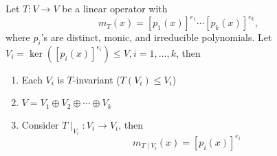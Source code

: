 \begin{theorem}
Let $T:V\to V$ be a linear operator with
\[
m_T(x) = [p_1(x)]^{e_1}\cdots[p_k(x)]^{e_k},
\]
where $p_i$'s are distinct, monic, and irreducible polynomials.
Let $V_i=\ker([p_i(x)]^{e_i})\le V, i=1,\dots,k$,
then
\begin{enumerate}
\item
Each $V_i$ is $T$-invariant ($T(V_i)\le V_i$)
\item
$V=V_1\oplus V_2\oplus\cdots\oplus V_k$
\item
Consider $T\mid_{V_i}:V_i\to V_i$, then
\[
m_{T\mid V_i}(x) = [p_i(x)]^{e_i}
\]
\end{enumerate}
\end{theorem}






















